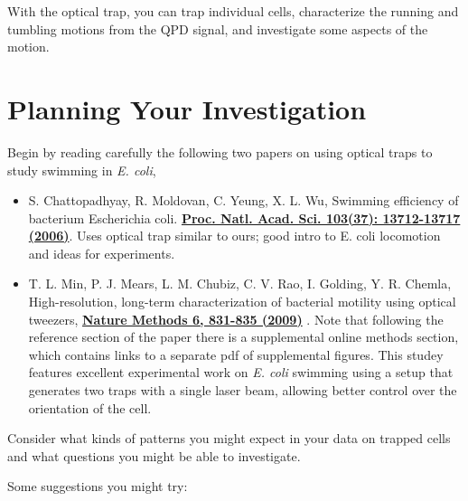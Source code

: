 \documentclass{../lab}
\begin{document}
With the optical trap, you can trap individual cells, characterize the running and tumbling motions from the QPD signal, and investigate some aspects of the motion.

\section{Planning Your Investigation}

Begin by reading carefully the following two papers on using optical traps to study swimming in \emph{E. coli},

\begin{itemize}
    \item S. Chattopadhyay, R. Moldovan, C. Yeung, X. L. Wu, Swimming efficiency of bacterium Escherichia coli. \href{http://www.ncbi.nlm.nih.gov/pmc/articles/PMC1564254/}{\textbf{Proc. Natl. Acad. Sci. 103(37): 13712-13717 (2006)}}. Uses optical trap similar to ours; good intro to E. coli locomotion and ideas for experiments.

    \item T. L. Min, P. J. Mears, L. M. Chubiz, C. V. Rao, I. Golding, Y. R. Chemla, High-resolution, long-term characterization of bacterial motility using optical tweezers, \href{http://www.nature.com/nmeth/journal/v6/n11/full/nmeth.1380.html}{\textbf{Nature Methods \textbf{6}, 831-835 (2009)}} . Note that following the reference section of the paper there is a supplemental online methods section, which contains links to a separate pdf of supplemental figures. This studey features excellent experimental work on \emph{E. coli} swimming using a setup that generates two traps with a single laser beam, allowing better control over the orientation of the cell.

\end{itemize}

Consider what kinds of patterns you might expect in your data on trapped cells and what questions you might be able to investigate.

Some suggestions you might try:
\end{document}

